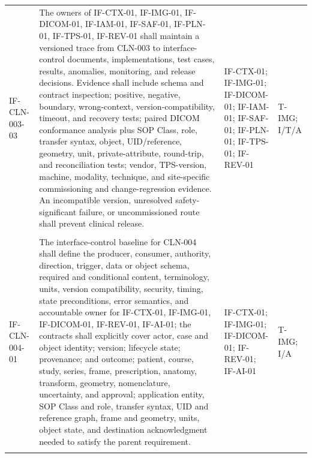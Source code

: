 \documentclass[11pt,letterpaper]{article}
\begin{document}
\begin{scriptsize}
\begin{longtable}{@{}L{0.14\textwidth}L{0.49\textwidth}L{0.19\textwidth}L{0.10\textwidth}@{}}
\addlinespace[2pt]
\mbox{IF-CLN-003-03} & The owners of IF-CTX-01, IF-IMG-01, IF-DICOM-01, IF-IAM-01, IF-SAF-01, IF-PLN-01, IF-TPS-01, IF-REV-01 shall maintain a versioned trace from CLN-003 to interface-control documents, implementations, test cases, results, anomalies, monitoring, and release decisions. Evidence shall include schema and contract inspection; positive, negative, boundary, wrong-context, version-compatibility, timeout, and recovery tests; paired DICOM conformance analysis plus SOP Class, role, transfer syntax, object, UID\slash\allowbreak{}reference, geometry, unit, private-attribute, round-trip, and reconciliation tests; vendor, TPS-version, machine, modality, technique, and site-specific commissioning and change-regression evidence. An incompatible version, unresolved safety-significant failure, or uncommissioned route shall prevent clinical release. & IF-CTX-01; IF-IMG-01; IF-DICOM-01; IF-IAM-01; IF-SAF-01; IF-PLN-01; IF-TPS-01; IF-REV-01 & T-IMG; I\slash\allowbreak{}T\slash\allowbreak{}A \\
\addlinespace[2pt]
 \\
\addlinespace[2pt]
\mbox{IF-CLN-004-01} & The interface-control baseline for CLN-004 shall define the producer, consumer, authority, direction, trigger, data or object schema, required and conditional content, terminology, units, version compatibility, security, timing, state preconditions, error semantics, and accountable owner for IF-CTX-01, IF-IMG-01, IF-DICOM-01, IF-REV-01, IF-AI-01; the contracts shall explicitly cover actor, case and object identity; version; lifecycle state; provenance; and outcome; patient, course, study, series, frame, prescription, anatomy, transform, geometry, nomenclature, uncertainty, and approval; application entity, SOP Class and role, transfer syntax, UID and reference graph, frame and geometry, units, object state, and destination acknowledgment needed to satisfy the parent requirement. & IF-CTX-01; IF-IMG-01; IF-DICOM-01; IF-REV-01; IF-AI-01 & T-IMG; I\slash\allowbreak{}A \\
\addlinespace[2pt]

\end{longtable}
\end{scriptsize}
\end{document}

